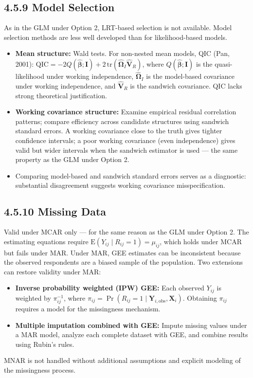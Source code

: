 \documentclass[11pt]{article}
\newcommand{\bY}{\mathbf{Y}}
\newcommand{\bX}{\mathbf{X}}
\newcommand{\bbeta}{\boldsymbol{\beta}}
\newcommand{\E}{\mathrm{E}}
\begin{document}
\subsection*{4.5.9 Model Selection}

As in the GLM under Option 2, LRT-based selection is not available. Model selection methods are less well developed than for likelihood-based models.

\begin{itemize}[leftmargin=2em]
  \item \textbf{Mean structure:} Wald tests. For non-nested mean models, QIC (Pan, 2001): $\text{QIC} = -2Q(\hat{\bbeta}; \mathbf{I}) + 2\,\mathrm{tr}(\hat{\boldsymbol{\Omega}}_I\hat{\mathbf{V}}_R)$, where $Q(\hat{\bbeta}; \mathbf{I})$ is the quasi-likelihood under working independence, $\hat{\boldsymbol{\Omega}}_I$ is the model-based covariance under working independence, and $\hat{\mathbf{V}}_R$ is the sandwich covariance. QIC lacks strong theoretical justification.
  \item \textbf{Working covariance structure:} Examine empirical residual correlation patterns; compare efficiency across candidate structures using sandwich standard errors. A working covariance close to the truth gives tighter confidence intervals; a poor working covariance (even independence) gives valid but wider intervals when the sandwich estimator is used --- the same property as the GLM under Option 2.
  \item Comparing model-based and sandwich standard errors serves as a diagnostic: substantial disagreement suggests working covariance misspecification.
\end{itemize}

\subsection*{4.5.10 Missing Data}

Valid under MCAR only --- for the same reason as the GLM under Option 2. The estimating equations require $\E(Y_{ij} \mid R_{ij} = 1) = \mu_{ij}$, which holds under MCAR but fails under MAR. Under MAR, GEE estimates can be inconsistent because the observed respondents are a biased sample of the population. Two extensions can restore validity under MAR:
\begin{itemize}[leftmargin=2em]
  \item \textbf{Inverse probability weighted (IPW) GEE:} Each observed $Y_{ij}$ is weighted by $\pi_{ij}^{-1}$, where $\pi_{ij} = \Pr(R_{ij} = 1 \mid \bY_{i,\text{obs}}, \bX_i)$. Obtaining $\pi_{ij}$ requires a model for the missingness mechanism.
  \item \textbf{Multiple imputation combined with GEE:} Impute missing values under a MAR model, analyze each complete dataset with GEE, and combine results using Rubin's rules.
\end{itemize}
MNAR is not handled without additional assumptions and explicit modeling of the missingness process.
\end{document}
